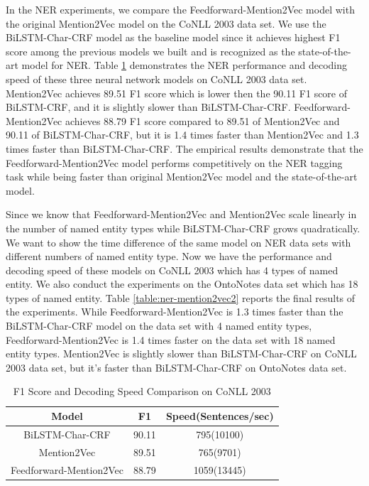 In the NER experiments, we compare the Feedforward-Mention2Vec model with the original Mention2Vec model on the CoNLL 2003 data set. We use the BiLSTM-Char-CRF model as the baseline model since it achieves highest F1 score among the previous models we built and is recognized as the state-of-the-art model for NER. Table \ref{table:ner-mention2vec1} demonstrates the NER performance and decoding speed of these three neural network models on CoNLL 2003 data set. Mention2Vec achieves 89.51 F1 score which is lower then the 90.11 F1 score of BiLSTM-CRF, and it is slightly slower than BiLSTM-Char-CRF. Feedforward-Mention2Vec achieves 88.79 F1 score compared to 89.51 of Mention2Vec and 90.11 of BiLSTM-Char-CRF, but it is 1.4 times faster than Mention2Vec and 1.3 times faster than BiLSTM-Char-CRF. The empirical results demonstrate that the Feedforward-Mention2Vec model performs competitively on the NER tagging task while being faster than original Mention2Vec model and the state-of-the-art model.

Since we know that Feedforward-Mention2Vec and Mention2Vec scale linearly in the number of named entity types while BiLSTM-Char-CRF grows quadratically. We want to show the time difference of the same model on NER data sets with different numbers of named entity type. Now we have the performance and decoding speed of these models on CoNLL 2003 which has 4 types of named entity. We also conduct the experiments on the OntoNotes data set which has 18 types of named entity. Table \ref{table:ner-mention2vec2} reports the final results of the experiments. While Feedforward-Mention2Vec is 1.3 times faster than the BiLSTM-Char-CRF model on the data set with 4 named entity types, Feedforward-Mention2Vec is 1.4 times faster on the data set with 18 named entity types. Mention2Vec is slightly slower than BiLSTM-Char-CRF on CoNLL 2003 data set, but it's faster than BiLSTM-Char-CRF on OntoNotes data set.

\begin{table}[]
\centering
\caption{F1 Score and Decoding Speed Comparison on CoNLL 2003}
\label{table:ner-mention2vec1}
\begin{tabular}{|c|c|c|}
\hline
Model            & F1     & Speed(Sentences/sec)        \\ \hline
BiLSTM-Char-CRF & 90.11  & 795(10100)            \\ \hline
Mention2Vec  & 89.51     & 765(9701)              \\ \hline
Feedforward-Mention2Vec      & 88.79  &  1059(13445)                   \\ \hline
\end{tabular}
\end{table}


